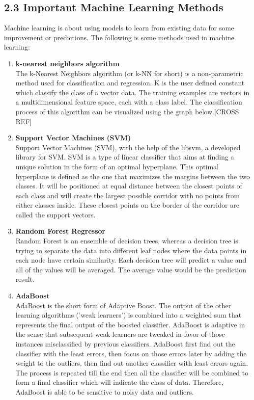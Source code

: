 \documentclass{article}
\begin{document}
	\subsection{2.3 Important Machine Learning Methods}
	Machine learning is about using models to learn from existing data for some improvement or predictions. 
	The following is some methods used in machine learning:
	\begin{enumerate}
		\item \textbf{k-nearest neighbors algorithm} \\
		The k-Nearest Neighbors algorithm (or k-NN for short) is a non-parametric method used for classification and regression. 
		K is the user defined constant which classify the class of a vector data. The training examples are vectors in a multidimensional feature space, 
		each with a class label. The classification process of this algorithm can be visualized using the graph below.[CROSS REF]
	
		\item \textbf{Support Vector Machines (SVM)} \\
		Support Vector Machines (SVM), with the help of the libsvm, a developed library for SVM. 
		SVM is a type of linear classiﬁer that aims at finding a unique solution in the form of an optimal hyperplane. 
		This optimal hyperplane is defined as the one that maximizes the margins between the two classes. 
		It will be positioned at equal distance between the closest points of each class and will create the largest possible corridor with no points 
		from either classes inside. These closest points on the border of the corridor are called the support vectors.
	
		\item \textbf{Random Forest Regressor} \\
		Random Forest is an ensemble of decision trees, whereas a decision tree is trying to separate the data into different
		leaf nodes where the data points in each node have certain similarity. Each decision tree will predict a value and all of the values 
		will be averaged. The average value would be the prediction result.
	
		\item \textbf{AdaBoost} \\
		AdaBoost is the short form of Adaptive Boost. The output of the other learning algorithms ('weak learners') is combined 
		into a weighted sum that represents the final output of the boosted classifier. AdaBoost is adaptive in the sense that subsequent weak 
		learners are tweaked in favor of those instances misclassified by previous classifiers. AdaBoost first find out the classifier with the least errors, 
		then focus on those errors later by adding the weight to the outliers, then find out another classifier with least errors again. 
		The process is repeated till the end then all the classifier will be combined to form a final classifier which will indicate the class of data. 
		Therefore, AdaBoost is able to be sensitive to noisy data and outliers.
	

\end{enumerate}
\end{document}
